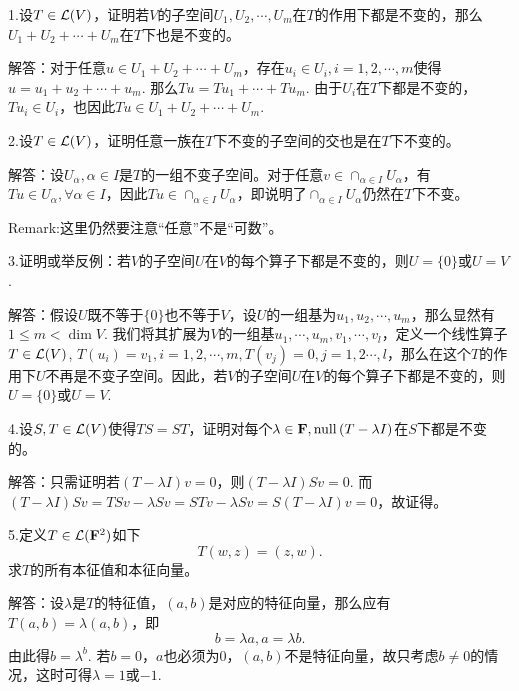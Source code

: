 \documentclass[hyperref,]{ctexart}
\begin{document}
\noindent{}1.设\(T\in\mathcal{L}(V)\)，证明若\(V\)的子空间\(U_1,U_2,\cdots,U_m\)在\(T\)的作用下都是不变的，那么\(U_1+U_2+\cdots+U_m\)在\(T\)下也是不变的。

\smallskip

\noindent{}解答：对于任意\(u \in U_1+U_2+\cdots+U_m\)，存在\(u_i\in U_i,i=1,2,\cdots,m\)使得\(u=u_1+u_2+\cdots+u_m\).
那么\(Tu = Tu_1+\cdots+Tu_m\).
由于\(U_i\)在\(T\)下都是不变的，\(Tu_i\in U_i\)，也因此\(Tu \in U_1+U_2+\cdots+U_m\).

\bigskip

\noindent{}2.设\(T\in\mathcal{L}(V)\)，证明任意一族在\(T\)下不变的子空间的交也是在\(T\)下不变的。

\smallskip

\noindent{}解答：设\(U_{\alpha},\alpha\in I\)是\(T\)的一组不变子空间。对于任意\(v\in\cap_{\alpha\in I} U_{\alpha}\)，有\(Tu\in U_{\alpha},\forall\alpha\in I\)，因此\(Tu\in\cap_{\alpha\in I}U_{\alpha}\)，即说明了\(\cap_{\alpha\in I} U_{\alpha}\)仍然在\(T\)下不变。

\noindent{}Remark:这里仍然要注意``任意''不是``可数''。

\bigskip

\noindent{}3.证明或举反例：若\(V\)的子空间\(U\)在\(V\)的每个算子下都是不变的，则\(U=\{0\}\)或\(U=V\).

\smallskip

\noindent{}解答：假设\(U\)既不等于\(\{0\}\)也不等于\(V\)，设\(U\)的一组基为\(u_1,u_2,\cdots,u_m\)，那么显然有\(1\le m<\dim V\).
我们将其扩展为\(V\)的一组基\(u_1,\cdots,u_m,v_1,\cdots,v_l\)，定义一个线性算子\(T\in\mathcal{L}(V)\),
\(T(u_i)=v_1,i=1,2,\cdots,m, T(v_j)=0,j=1,2\cdots,l\)，那么在这个\(T\)的作用下\(U\)不再是不变子空间。因此，若\(V\)的子空间\(U\)在\(V\)的每个算子下都是不变的，则\(U=\{0\}\)或\(U=V\).

\bigskip

\noindent{}4.设\(S,T\in\mathcal{L}(V)\)使得\(TS=ST\)，证明对每个\(\lambda \in \mathbf{F},\mathrm{null}\, (T-\lambda I)\)在\(S\)下都是不变的。

\smallskip

\noindent{}解答：只需证明若\((T-\lambda I)v=0\)，则\((T-\lambda I)Sv=0\).
而\((T-\lambda I)Sv=TSv-\lambda Sv = STv-\lambda Sv=S(T-\lambda I)v=0\)，故证得。

\bigskip

\noindent{}5.定义\(T\in\mathcal{L}(\mathbf{F}^2)\)如下 \[T(w,z)=(z,w).\]
求\(T\)的所有本征值和本征向量。

\smallskip

\noindent{}解答：设\(\lambda\)是\(T\)的特征值，\((a,b)\)是对应的特征向量，那么应有\(T(a,b)=\lambda(a,b)\)，即
\[b=\lambda a, a= \lambda b.\] 由此得\(b=\lambda^b\).
若\(b=0\)，\(a\)也必须为\(0\)，\((a,b)\)不是特征向量，故只考虑\(b\ne 0\)的情况，这时可得\(\lambda=1\)或\(-1\).
\end{document}
